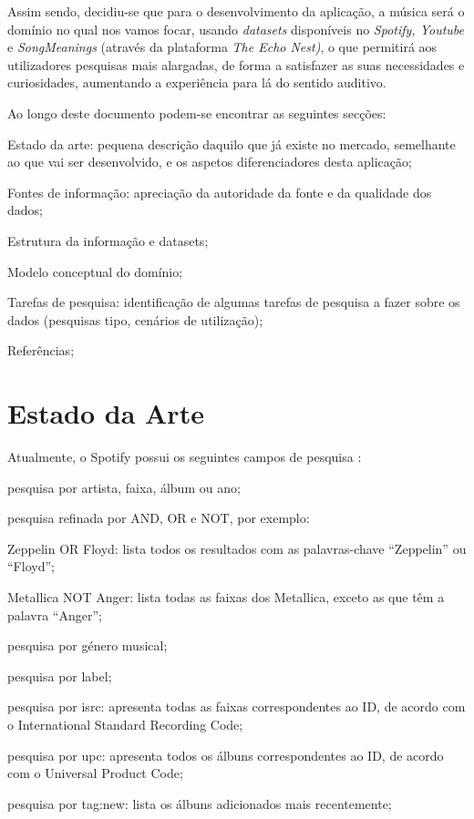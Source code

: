 \documentclass[twocolumn,twoside,11pt,a4paper]{article}
\begin{document}
Assim sendo, decidiu-se que para o desenvolvimento da aplicação, a música será o domínio no qual nos vamos focar, usando \textit{datasets} disponíveis no \textit{Spotify, Youtube} e \textit{SongMeanings} (através da plataforma \textit{The Echo Nest)}, o que permitirá aos utilizadores pesquisas mais alargadas, de forma a satisfazer as suas necessidades e curiosidades, aumentando a experiência para lá do sentido auditivo.

Ao longo deste documento podem-se encontrar as seguintes secções:
\begin{compactitem}
  \item Estado da arte: pequena descrição daquilo que já existe no mercado, semelhante
    ao que vai ser desenvolvido, e os aspetos diferenciadores desta aplicação;
  \item Fontes de informação: apreciação da autoridade da fonte e da qualidade dos
    dados;
  \item Estrutura da informação e datasets;
  \item Modelo conceptual do domínio;
  \item Tarefas de pesquisa: identificação de algumas tarefas de pesquisa a fazer sobre
    os dados (pesquisas tipo, cenários de utilização);
  \item Referências;
\end{compactitem}


\section{Estado da Arte}\label{sec:art}

Atualmente, o Spotify possui os seguintes campos de pesquisa \cite{search}
:
\begin{compactitem}
  \item pesquisa por artista, faixa, álbum ou ano;
  \item pesquisa refinada por AND, OR e NOT, por exemplo:
    \begin{compactitem}
      \item Zeppelin OR Floyd: lista todos os resultados com as palavras-chave
        “Zeppelin” ou “Floyd”;
      \item Metallica NOT Anger: lista todas as faixas dos Metallica, exceto as que têm
        a palavra “Anger”;
    \end{compactitem}
  \item pesquisa por género musical;
  \item pesquisa por label;
  \item pesquisa por isrc: apresenta todas as faixas correspondentes ao ID, de acordo com
    o International Standard Recording Code;
  \item pesquisa por upc: apresenta todos os álbuns correspondentes ao ID, de acordo com
    o Universal Product Code;
  \item pesquisa por tag:new: lista os álbuns adicionados mais recentemente;
\end{compactitem}
\end{document}
